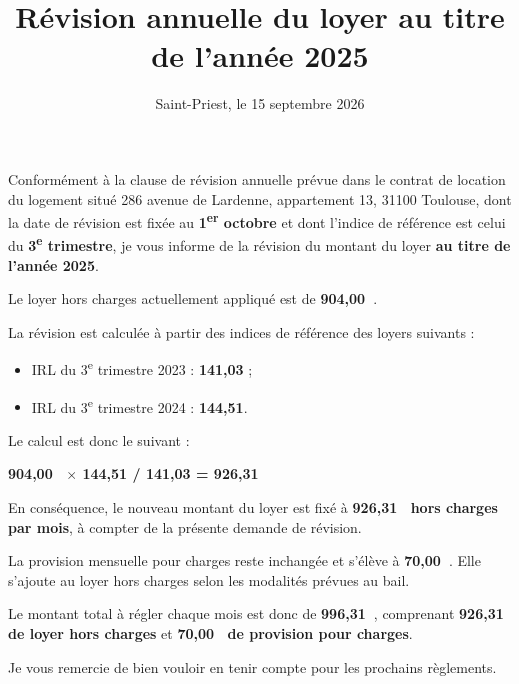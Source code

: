 \documentclass[11pt,a4paper,sans]{moderncv}
\title{Révision annuelle du loyer au titre de l'année 2025}
\date{Saint-Priest, le 15 septembre 2026}
\newcommand{\adresseLogement}{286 avenue de Lardenne, appartement 13, 31100 Toulouse}
\newcommand{\priseEffet}{à compter de la présente demande de révision}
\begin{document}
    \makelettertitle

    Conformément à la clause de révision annuelle prévue dans le contrat de location du logement situé \adresseLogement, dont la date de révision est fixée au \textbf{1\textsuperscript{er} octobre} et dont l'indice de référence est celui du \textbf{3\textsuperscript{e} trimestre}, je vous informe de la révision du montant du loyer \textbf{au titre de l'année 2025}.

    Le loyer hors charges actuellement appliqué est de \textbf{904,00~\texteuro}.

    La révision est calculée à partir des indices de référence des loyers suivants :
    \begin{itemize}
        \item IRL du 3\textsuperscript{e} trimestre 2023 : \textbf{141,03} ;
        \item IRL du 3\textsuperscript{e} trimestre 2024 : \textbf{144,51}.
    \end{itemize}

    Le calcul est donc le suivant :
    \begin{center}
        \textbf{904,00~\texteuro{} $\times$ 144,51 / 141,03 = 926,31~\texteuro}
    \end{center}

    En conséquence, le nouveau montant du loyer est fixé à \textbf{926,31~\texteuro{} hors charges par mois}, \priseEffet.

    La provision mensuelle pour charges reste inchangée et s'élève à \textbf{70,00~\texteuro}. Elle s'ajoute au loyer hors charges selon les modalités prévues au bail.

    Le montant total à régler chaque mois est donc de \textbf{996,31~\texteuro}, comprenant \textbf{926,31~\texteuro{} de loyer hors charges} et \textbf{70,00~\texteuro{} de provision pour charges}.

    Je vous remercie de bien vouloir en tenir compte pour les prochains règlements.

    \makeletterclosing
\end{document}
